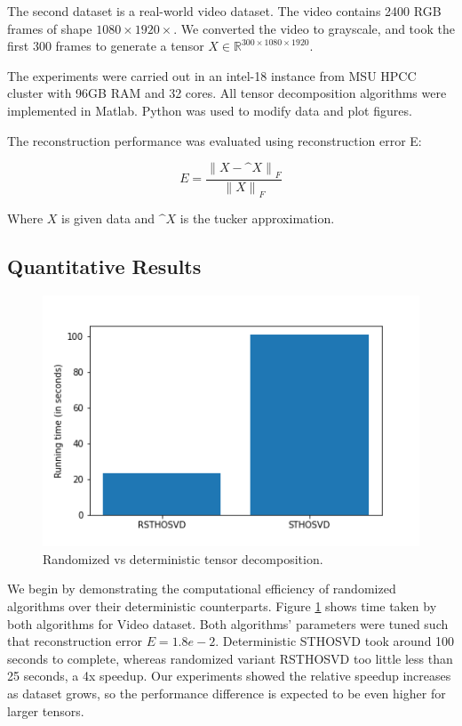 \documentclass[preprint]{elsarticle}
\begin{document}
\noindent The second dataset is a real-world video dataset. The video contains 2400 RGB frames of shape $1080\times1920\times$. We converted the video to grayscale, and took the first 300 frames to generate a tensor $X \in \mathbb{R}^{300\times1080\times1920}$.

\noindent The experiments were carried out in an intel-18 instance from MSU HPCC cluster with 96GB RAM and 32 cores. All tensor decomposition algorithms were implemented in Matlab. Python was used to modify data and plot figures. 

\noindent The reconstruction performance was evaluated using reconstruction error E:

\begin{equation*}
    E = \frac{{\lVert X-\^{X} \rVert}_F}{{\lVert X \rVert}_F}
\end{equation*}

\noindent Where $X$ is given data and $\^{X}$ is the tucker approximation.

\subsection{Quantitative Results}


\begin{figure}[h]
    \centering
    \includegraphics[scale=0.7]{figs/rVSd.png}
    \caption{Randomized vs deterministic tensor decomposition.}
    \label{rvsd}
\end{figure}

We begin by demonstrating the computational efficiency of randomized algorithms over their deterministic counterparts. Figure \ref{rvsd} shows time taken by both algorithms for Video dataset. Both algorithms' parameters were tuned such that reconstruction error $E=1.8e-2$. Deterministic STHOSVD took around 100 seconds to complete, whereas randomized variant RSTHOSVD too little less than 25 seconds, a 4x speedup. Our experiments showed the relative speedup increases as dataset grows, so the performance difference is expected to be even higher for larger tensors. 
\end{document}
